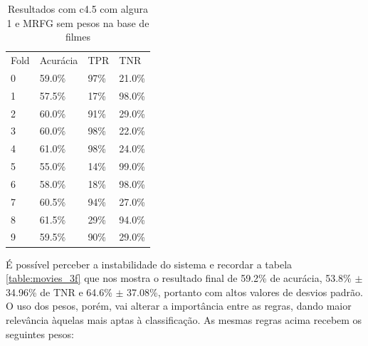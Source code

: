 \documentclass[template.tex]{subfiles}
\begin{document}
\begin{table}[htbp]
	\centering
    \begin{tabular}{llll}
    Fold & Acurácia & TPR & TNR \\
    0 & 59.0\% & 97\% & 21.0\% \\
    1 & 57.5\% & 17\% & 98.0\% \\
    2 & 60.0\% & 91\% & 29.0\% \\
    3 & 60.0\% & 98\% & 22.0\% \\
    4 & 61.0\% & 98\% & 24.0\% \\
    5 & 55.0\% & 14\% & 99.0\% \\
    6 & 58.0\% & 18\% & 98.0\% \\
    7 & 60.5\% & 94\% & 27.0\% \\
    8 & 61.5\% & 29\% & 94.0\% \\
    9 & 59.5\% & 90\% & 29.0\% \\
    \end{tabular}
        \caption{Resultados com c4.5 com algura 1 e MRFG sem pesos na base de filmes}
    \label{table:movie_folds_2}
\end{table}


É possível perceber a instabilidade do sistema e recordar a tabela \ref{table:movies_3f} que nos mostra o resultado final de 59.2\% de acurácia, 53.8\% $\pm$ 34.96\% de TNR e 64.6\% $\pm$ 37.08\%, portanto com altos valores de desvios padrão. O uso dos pesos, porém, vai alterar a importância entre as regras, dando maior relevância àquelas mais aptas à classificação. As mesmas regras acima recebem os seguintes pesos:
\end{document}
